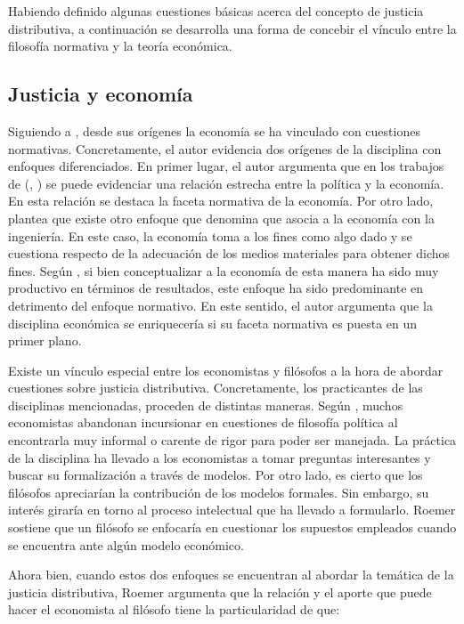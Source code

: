 Habiendo definido algunas cuestiones básicas acerca del concepto de justicia distributiva, a continuación se desarrolla una forma de concebir el vínculo entre la filosofía normativa y la teoría económica.

\subsection{Justicia y economía} \label{sec2.2}

Siguiendo a \citet{Sen_1991}, desde sus orígenes la economía se ha vinculado con cuestiones normativas. Concretamente, el autor evidencia dos orígenes de la disciplina con enfoques diferenciados. En primer lugar, el autor argumenta que en los trabajos de \citeauthor{Aristoteles_2005} (\citeyear{Aristoteles_2005}, \citeyear{Aristoteles_2014}) se puede evidenciar una relación estrecha entre la política y la economía. En esta relación se destaca la faceta normativa de la economía. Por otro lado, \citet{Sen_1991} plantea que existe otro enfoque que denomina que asocia a la economía con la ingeniería. En este caso, la economía toma a los fines como algo dado y se cuestiona respecto de la adecuación de los medios materiales para obtener dichos fines. Según \citet{Sen_1991}, si bien conceptualizar a la economía de esta manera ha sido muy productivo en términos de resultados, este enfoque ha sido predominante en detrimento del enfoque normativo. En este sentido, el autor argumenta que la disciplina económica se enriquecería si su faceta normativa es puesta en un primer plano.

Existe un vínculo especial entre los economistas y filósofos a la hora de abordar cuestiones sobre justicia distributiva. Concretamente, los practicantes de las disciplinas mencionadas, proceden de distintas maneras. Según \citet{Roemer_1996a}, muchos economistas abandonan incursionar en cuestiones de filosofía política al encontrarla muy informal o carente de rigor para poder ser manejada. La práctica de la disciplina ha llevado a los economistas a tomar preguntas interesantes y buscar su formalización a través de modelos. Por otro lado, es cierto que los filósofos apreciarían la contribución de los modelos formales. Sin embargo, su interés giraría en torno al proceso intelectual que ha llevado a formularlo. Roemer sostiene que un filósofo se enfocaría en cuestionar los supuestos empleados cuando se encuentra ante algún modelo económico.  

Ahora bien, cuando estos dos enfoques se encuentran al abordar la temática de la justicia distributiva, Roemer argumenta que la relación y el aporte que puede hacer el economista al filósofo tiene la particularidad de que:
\vspace{3mm}

